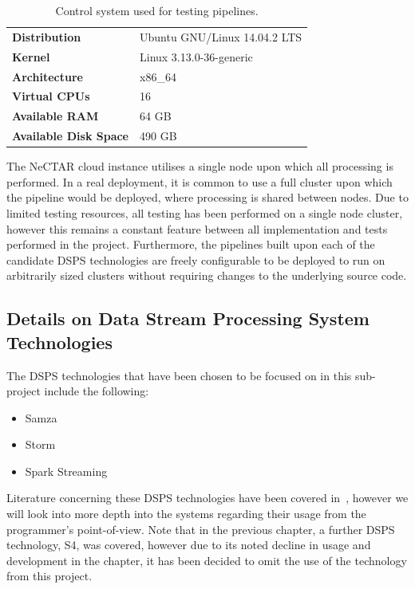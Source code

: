 \begin{table}[ht]
\caption{Control system used for testing pipelines.}
\label{tab:control}
\centering
\begin{tabular}{ll}
\textbf{Distribution}         & Ubuntu GNU/Linux 14.04.2 LTS \\
\textbf{Kernel}               & Linux 3.13.0-36-generic    \\
\textbf{Architecture}         & x86\_64                    \\
\textbf{Virtual CPUs}         & 16                         \\
\textbf{Available RAM}        & 64 GB                      \\
\textbf{Available Disk Space} & 490 GB
\end{tabular}
\end{table}

The NeCTAR cloud instance utilises a single node upon which all processing is performed. In a real deployment, it is
common to use a full cluster upon which the pipeline would be deployed, where processing is shared between nodes. Due to
limited testing resources, all testing
has been performed on a single node cluster, however this remains a constant feature between all implementation and tests
performed in the project. Furthermore, the pipelines built upon
each of the candidate DSPS technologies are freely configurable to be deployed to run on arbitrarily sized clusters without
requiring changes to the underlying source code.



\subsection{Details on Data Stream Processing System Technologies} %
\label{sub:setting_up_of_dsps_technologies}

The DSPS technologies that have been chosen to be focused on in this sub-project include the following:

\begin{itemize}
  \item Samza
  \item Storm
  \item Spark Streaming
\end{itemize}

Literature concerning these DSPS technologies have been covered in~, however
we will look into more depth into the systems regarding their usage from the programmer's point-of-view. Note that
in the previous chapter, a further DSPS technology, S4, was covered, however due to its noted decline in usage and
development in the chapter, it has been decided to omit the use of the technology from this project.

